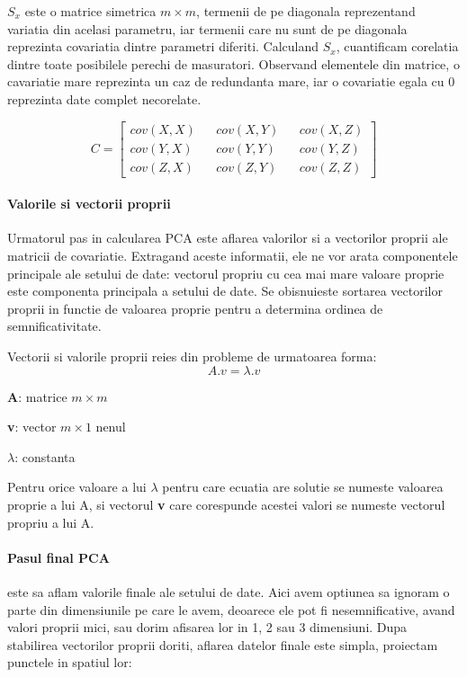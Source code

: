 \documentclass[12pt]{article}
\begin{document}
$S_x$ este o matrice simetrica $m \times m$, termenii de pe diagonala reprezentand variatia din acelasi parametru, iar termenii care nu sunt de pe diagonala reprezinta covariatia dintre parametri diferiti. Calculand $S_x$, cuantificam corelatia dintre toate posibilele perechi de masuratori. Observand elementele din matrice, o cavariatie mare reprezinta un caz de redundanta mare, iar o covariatie egala cu 0 reprezinta date complet necorelate.

\begin{equation}
C=\begin{bmatrix}
cov(X,X) && cov(X,Y) && cov(X,Z) \\
cov(Y,X) && cov(Y,Y) && cov(Y,Z) \\
cov(Z,X) && cov(Z,Y) && cov(Z,Z)
\end{bmatrix}
\end{equation}


\paragraph{Valorile si vectorii proprii}
Urmatorul pas in calcularea PCA este aflarea valorilor si a vectorilor proprii ale matricii de covariatie. Extragand aceste informatii, ele ne vor arata componentele principale ale setului de date: vectorul propriu cu cea mai mare valoare proprie este componenta principala a setului de date. Se obisnuieste sortarea vectorilor proprii in functie de valoarea proprie pentru a determina ordinea de semnificativitate.

Vectorii si valorile proprii reies din probleme de urmatoarea forma:
\begin{equation}
A.v= \lambda . v
\end{equation}

\textbf{A}: matrice $m \times m$


\textbf{v}: vector $m \times 1$  nenul


$\lambda$: constanta

Pentru orice valoare a lui $\lambda$ pentru care ecuatia are solutie se numeste valoarea proprie a lui A, si vectorul \textbf{v} care corespunde acestei valori se numeste vectorul propriu a lui A.

\paragraph{Pasul final PCA} este sa aflam valorile finale ale setului de date. Aici avem optiunea sa ignoram o parte din dimensiunile pe care le avem, deoarece ele pot fi nesemnificative, avand valori proprii mici, sau dorim afisarea lor in 1, 2 sau 3 dimensiuni. Dupa stabilirea vectorilor proprii doriti, aflarea datelor finale este simpla, proiectam punctele in spatiul lor: 
\end{document}
